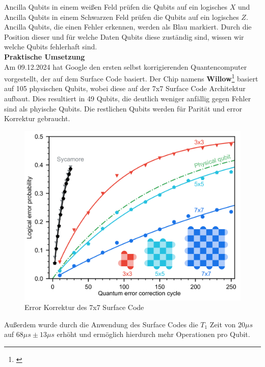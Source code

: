Ancilla Qubits in einem weißen Feld prüfen die Qubits auf ein logisches $X$ und Ancilla Qubits in einem Schwarzen Feld prüfen die Qubits auf ein logisches $Z$.\\

Ancilla Qubits, die einen Fehler erkennen, werden als Blau markiert. Durch die Position dieser und für welche Daten Qubits diese zuständig sind, wissen wir welche Qubits fehlerhaft sind.\\

\textbf{Praktische Umsetzung}\\
Am 09.12.2024 hat Google den ersten selbst korrigierenden Quantencomputer vorgestellt, der auf dem Surface Code basiert.
Der Chip namens \textbf{Willow}\footnote{\cite{acharya_quantum_2024}} basiert auf 105 physischen Qubits, wobei diese auf der 7x7 Surface Code Architektur aufbaut.
Dies resultiert in 49 Qubits, die deutlich weniger anfällig gegen Fehler sind als phyische Qubits. Die restlichen Qubits werden für Parität und error Korrektur gebraucht.\\

\begin{figure}[H]
    \centering
    \includegraphics[width=0.7\linewidth]{img/Surface-Code-Scaling.png}
    \caption{Error Korrektur des 7x7 Surface Code \cite{acharya_quantum_2024}}
    \label{fig:Willow}
\end{figure}

Außerdem wurde durch die Anwendung des Surface Codes die $T_1$ Zeit von $20\mu s$ auf $68\mu s\pm13\mu s$ erhöht und ermöglich hierdurch mehr Operationen pro Qubit.\\